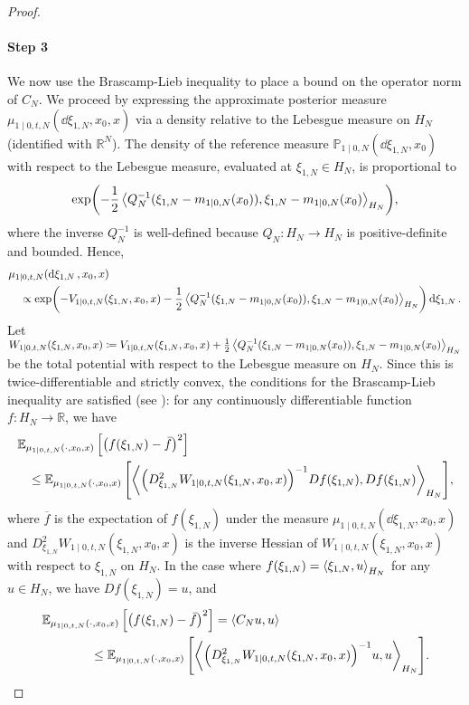 \begin{proof}
  \paragraph{Step 3}
  We now use the Brascamp-Lieb inequality \citep{brascamp1976extensions} to place a bound on the operator norm of \(C_{N}\). We proceed by expressing the approximate posterior measure \(\mathbb{\mu}_{1 \mid 0, t, N}(\dd{\xi_{1, N}}, x_{0}, x)\) via a density relative to the Lebesgue measure on \(H_{N}\) (identified with \(\mathbb{R}^{N}\)). The density of the reference measure \(\mathbb{P}_{1 \mid 0, N}(\dd{\xi_{1, N}}, x_{0})\) with respect to the Lebesgue measure, evaluated at \(\xi_{1, N} \in H_{N}\), is proportional to
  \[\exp(-\frac{1}{2} \ev{Q_{N}^{-1} (\xi_{1, N} - m_{1 \mid 0, N}(x_{0})), \xi_{1, N} - m_{1 \mid 0, N}(x_{0})}_{H_{N}}),
  \]
  where the inverse \(Q_{N}^{-1}\) is well-defined because \(Q_{N} : H_{N} \to H_{N}\) is positive-definite and bounded. Hence, %
  \begin{align*}
    &\mu_{1 \mid 0, t, N}(\dd{\xi_{1, N}}, x_{0}, x) \\
    &\quad\propto \exp(-V_{1 \mid 0, t, N}(\xi_{1, N}, x_{0}, x) - \frac{1}{2} \ev{Q_{N}^{-1} (\xi_{1, N} - m_{1 \mid 0, N}(x_{0})), \xi_{1, N} - m_{1 \mid 0, N}(x_{0})}_{H_{N}}) \dd{\xi_{1, N}}.
  \end{align*}
  Let \(W_{1 \mid 0, t, N}(\xi_{1, N}, x_{0}, x) \coloneqq V_{1 \mid 0, t, N}(\xi_{1, N}, x_{0}, x) + \frac{1}{2} \ev{Q_{N}^{-1} (\xi_{1, N} - m_{1 \mid 0, N}(x_{0})), \xi_{1, N} - m_{1 \mid 0, N}(x_{0})}_{H_{N}}\)  be the total potential with respect to the Lebesgue measure on \(H_{N}\). Since this is twice-differentiable and strictly convex, the conditions for the Brascamp-Lieb inequality are satisfied (see \citep[][Theorem 4.1]{brascamp1976extensions}): for any continuously differentiable function \(f : H_{N} \to \mathbb{R}\), we have
  \begin{align*}
    &\mathop{\mathbb{E}_{\mu_{1 \mid 0, t, N}(\cdot, x_{0}, x)}}\qty[\qty(f(\xi_{1, N}) - \bar{f})^{2}]\\
    &\quad\leq \mathop{\mathbb{E}_{\mu_{1 \mid 0, t, N}(\cdot, x_{0}, x)}}\qty[\ev{ \qty(D^{2}_{\xi_{1, N}}W_{1 \mid 0, t, N}(\xi_{1, N}, x_{0}, x))^{-1} D f(\xi_{1, N}), D f(\xi_{1, N}) }_{H_{N}}],
  \end{align*}
  where \(\overline{f}\) is the expectation of \(f(\xi_{1, N})\) under the measure \(\mu_{1 \mid 0, t, N}(\dd{\xi_{1, N}, x_{0}, x})\) and \(D^{2}_{\xi_{1, N}}W_{1 \mid 0, t, N}(\xi_{1, N}, x_{0}, x)\) is the inverse Hessian of \(W_{1 \mid 0, t, N}(\xi_{1, N}, x_{0}, x)\) with respect to \(\xi_{1, N}\) on \(H_{N}\). In the case where \(f(\xi_{1, N}) = \ev{\xi_{1, N}, u}_{H_{N}}\) for any \(u \in H_{N}\), we have \(Df(\xi_{1, N}) = u\), and
  \begin{align}
    &\mathop{\mathbb{E}_{\mu_{1 \mid 0, t, N}(\cdot, x_{0}, x)}}\qty[\qty(f(\xi_{1, N}) - \bar{f})^{2}] = \ev{C_{N}u, u} \notag\\
    &\qquad\qquad\leq  \mathop{\mathbb{E}_{\mu_{1 \mid 0, t, N}(\cdot, x_{0}, x)}}\qty[\ev{ \qty(D^{2}_{\xi_{1, N}}W_{1 \mid 0, t, N}(\xi_{1, N}, x_{0}, x))^{-1} u, u }_{H_{N}}]. \label{eqn:brascamp}
  \end{align}

\end{proof}
